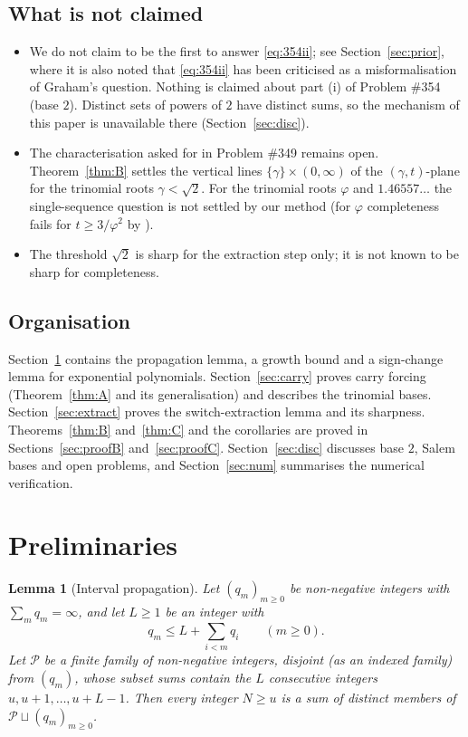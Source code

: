 \documentclass[11pt]{amsart}
\newtheorem{lemma}{Lemma}[section]
\theoremstyle{definition}
\theoremstyle{remark}
\begin{document}
\subsection{What is not claimed}
\begin{itemize}[leftmargin=1.5em]
\item We do not claim to be the first to answer \eqref{eq:354ii}; see Section~\ref{sec:prior},
where it is also noted that \eqref{eq:354ii} has been criticised as a misformalisation of
Graham's question. Nothing is claimed about part (i) of Problem \#354 (base $2$). Distinct sets of powers of $2$
have distinct sums, so the mechanism of this paper is unavailable there
(Section~\ref{sec:disc}).
\item The characterisation asked for in Problem \#349 remains open. Theorem~\ref{thm:B}
settles the vertical lines $\{\gamma\}\times(0,\infty)$ of the $(\gamma,t)$-plane for the
trinomial roots $\gamma<\sqrt2$. For the trinomial roots $\varphi$ and $1.46557\ldots$ the
single-sequence question is not settled by our method (for $\varphi$ completeness fails for
$t\ge3/\varphi^2$ by \cite{vD26}).
\item The threshold $\sqrt2$ is sharp for the extraction step only; it is not known to be sharp
for completeness.
\end{itemize}

\subsection*{Organisation}
Section~\ref{sec:prelim} contains the propagation lemma, a growth bound and a sign-change
lemma for exponential polynomials. Section~\ref{sec:carry} proves carry forcing
(Theorem~\ref{thm:A} and its generalisation) and describes the trinomial bases.
Section~\ref{sec:extract} proves the switch-extraction lemma and its sharpness.
Theorems~\ref{thm:B} and~\ref{thm:C} and the corollaries are proved in
Sections~\ref{sec:proofB} and~\ref{sec:proofC}. Section~\ref{sec:disc} discusses base $2$,
Salem bases and open problems, and Section~\ref{sec:num} summarises the numerical
verification.


\section{Preliminaries}\label{sec:prelim}

\begin{lemma}[Interval propagation]\label{lem:prop}
Let $(q_m)_{m\ge0}$ be non-negative integers with $\sum_m q_m=\infty$, and let $L\ge1$ be an
integer with
\begin{equation}\label{eq:propcond}
  q_m\le L+\sum_{i<m}q_i\qquad(m\ge0).
\end{equation}
Let $\mathcal P$ be a finite family of non-negative integers, disjoint (as an indexed
family) from $(q_m)$, whose subset sums contain the $L$ consecutive integers
$u,u+1,\dots,u+L-1$. Then every integer $N\ge u$ is a sum of distinct members of
$\mathcal P\sqcup(q_m)_{m\ge0}$.
\end{lemma}
\end{document}
